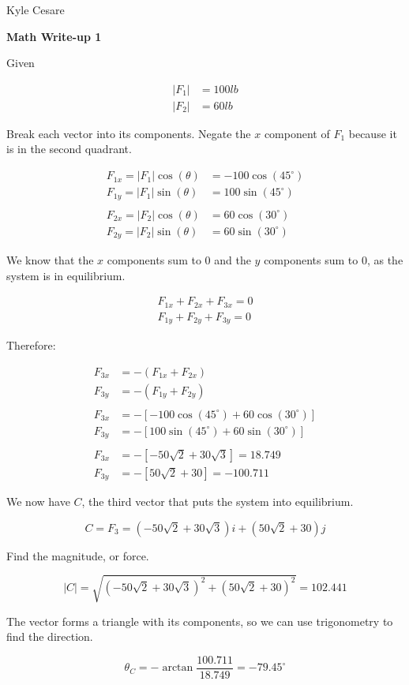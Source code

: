 \documentclass[11pt]{article}
\begin{document}
\begin{flushright}
  Kyle Cesare
\end{flushright}

{\center \textbf{Math Write-up 1} \\}

Given

\begin{align*}
  |F_1| &= 100lb \\
  |F_2| &= 60lb
\end{align*}

Break each vector into its components.  Negate the $x$ component of $F_1$
because it is in the second quadrant.

\begin{align*}
  F_{1x} = |F_1|\cos(\theta) &= -100\cos(45^{\circ}) \\
  F_{1y} = |F_1|\sin(\theta) &=  100\sin(45^{\circ}) \\\\
  F_{2x} = |F_2|\cos(\theta) &=  60 \cos(30^{\circ}) \\
  F_{2y} = |F_2|\sin(\theta) &=  60 \sin(30^{\circ})
\end{align*}

We know that the $x$ components sum to 0 and the $y$ components sum to 0, as the
system is in equilibrium.

\begin{align*}
  F_{1x} + F_{2x} + F_{3x} = 0 \\
  F_{1y} + F_{2y} + F_{3y} = 0
\end{align*}

Therefore:

\begin{align*}
  F_{3x} &= -( F_{1x} + F_{2x} ) \\
  F_{3y} &= -( F_{1y} + F_{2y} ) \\\\
  F_{3x} &= -\left[ -100\cos(45^{\circ}) + 60\cos(30^{\circ}) \right] \\
  F_{3y} &= -\left[  100\sin(45^{\circ}) + 60\sin(30^{\circ}) \right] \\\\
  F_{3x} &= -\left[ -50\sqrt2 + 30\sqrt3 \right] = 18.749 \\
  F_{3y} &= -\left[  50\sqrt2 + 30 \right] = -100.711
\end{align*}

We now have $C$, the third vector that puts the system into equilibrium.

$$
  C = F_3 = (-50\sqrt2 + 30\sqrt3)i + (50\sqrt2 + 30)j
$$

Find the magnitude, or force.

$$
  |C| = \sqrt{(-50\sqrt2 + 30\sqrt3)^2 + (50\sqrt2 + 30)^2} = 102.441
$$

The vector forms a triangle with its components, so we can use trigonometry to
find the direction.

$$
  \theta_C = -\arctan\frac{100.711}{18.749} = -79.45^{\circ}
$$
\end{document}

